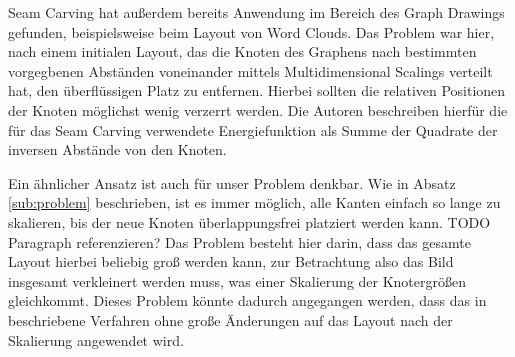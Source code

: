 Seam Carving hat außerdem bereits Anwendung im Bereich des Graph Drawings gefunden, beispielsweise beim Layout von Word Clouds.\cite{wu2011semantic} Das Problem war hier, nach einem initialen Layout, das die Knoten des Graphens nach bestimmten vorgegbenen Abständen voneinander mittels Multidimensional Scalings verteilt hat, den überflüssigen Platz zu entfernen. Hierbei sollten die relativen Positionen der Knoten möglichst wenig verzerrt werden. Die Autoren beschreiben hierfür die für das Seam Carving verwendete Energiefunktion als Summe der Quadrate der inversen Abstände von den Knoten.

Ein ähnlicher Ansatz ist auch für unser Problem denkbar. Wie in Absatz \ref{sub:problem} beschrieben, ist es immer möglich, alle Kanten einfach so lange zu skalieren, bis der neue Knoten überlappungsfrei platziert werden kann. TODO Paragraph referenzieren? Das Problem besteht hier darin, dass das gesamte Layout hierbei beliebig groß werden kann, zur Betrachtung also das Bild insgesamt verkleinert werden muss, was einer Skalierung der Knotergrößen gleichkommt. Dieses Problem könnte dadurch angegangen werden, dass das in \cite{wu2011semantic} beschriebene Verfahren ohne große Änderungen auf das Layout nach der Skalierung angewendet wird.
